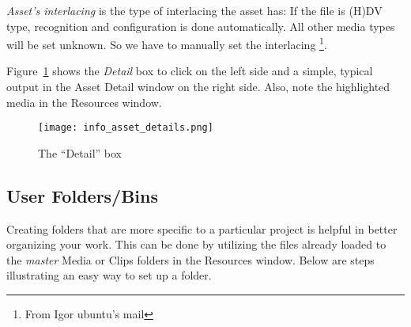 \textit{Asset's interlacing}  is the type of interlacing the asset has: If the file is (H)DV type, recognition and configuration is done automatically. All other media types will be set unknown. So we have to manually set the interlacing \protect\footnote{From Igor ubuntu's mail}.

Figure~\ref{fig:info_asset_details} shows the \textit{Detail} box to click on the left side and a simple, typical output in the Asset Detail window on the right side.  Also, note the highlighted media in the Resources window.

\begin{figure}[htpb]
    \centering
    \texttt{[image: info\_asset\_details.png]}
    \caption{The “Detail” box}
    \label{fig:info_asset_details}
\end{figure}

\subsection{User Folders/Bins}%
\label{sub:user_folders_bins}

Creating folders that are more specific to a particular project is helpful in better organizing your work.  
This can be done by utilizing the files already loaded to the \textit{master} Media or Clips folders in the Resources window.  
Below are steps illustrating an easy way to set up a folder.

